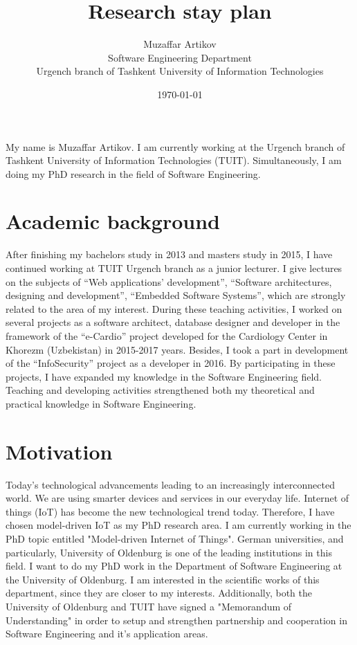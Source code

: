 \documentclass[10pt, oneside]{article}
\title{Research stay plan}
\author{Muzaffar Artikov\\
Software Engineering Department\\
Urgench branch of Tashkent University of Information Technologies}
\date{\today}
\begin{document}
\maketitle
My name is Muzaffar Artikov. I am currently working at the Urgench branch of Tashkent University of Information Technologies (TUIT). Simultaneously, I am doing my PhD research in the field of Software Engineering. 

\section{Academic background}

After finishing my bachelors study in 2013 and masters study in 2015, I have continued working at TUIT Urgench branch as a junior lecturer. I give lectures on the subjects of “Web applications’ development”, “Software architectures, designing and development”, “Embedded Software Systems”, which are strongly related to the area of my interest. During these teaching activities, I worked on several projects as a software architect, database designer and developer in the framework of the “e-Cardio” project developed for the Cardiology Center in Khorezm (Uzbekistan) in 2015-2017 years. Besides, I took a part in development of the “InfoSecurity” project as a developer in 2016. By participating in these projects, I have expanded my knowledge in the Software Engineering field. Teaching and developing activities strengthened both my theoretical and practical knowledge in Software Engineering. 
\section{Motivation}

Today’s technological advancements leading to an increasingly interconnected world. We are using smarter devices and services in our everyday life. Internet of things (IoT) has become the new technological trend today. Therefore, I have chosen model-driven IoT as my PhD research area. I am currently working in the PhD topic entitled "Model-driven Internet of Things".
German universities, and particularly, University of Oldenburg is one of the leading institutions in this field. I want to do my PhD work in the Department of Software Engineering at the University of Oldenburg. I am interested in the scientific works of this department, since they are closer to my interests. Additionally, both the University of Oldenburg and TUIT have signed a "Memorandum of Understanding" in order to setup and strengthen partnership and cooperation in Software 
Engineering and it’s application areas. 
\end{document}
